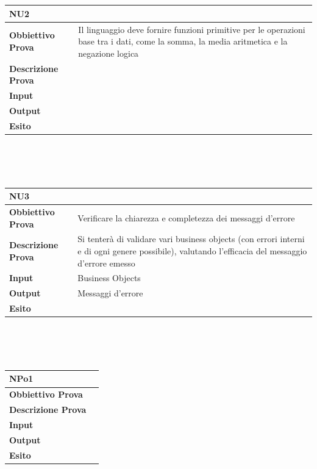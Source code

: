 \documentclass[11pt,titlepage,a4paper]{report}
\begin{document}
\\
\\
\begin{tabular}{||p{4.5cm}||p{7.5cm}||}
\hline
\textbf{\textsf{NU2}}& \\
\hline
{\textbf {Obbiettivo Prova}}& Il linguaggio deve fornire funzioni primitive per le operazioni base tra i dati, come la somma, la media aritmetica e la negazione logica \\ \hline
{\textbf{Descrizione Prova}}&  \\ \hline
{\textbf{Input}}&  \\ \hline
{\textbf{Output}}& \\ \hline
{\textbf{Esito}}&  \\ \hline
\end{tabular} \\
\\
\\
\begin{tabular}{||p{4.5cm}||p{7.5cm}||}
\hline
\textbf{\textsf{NU3}}& \\
\hline
{\textbf{Obbiettivo Prova}}& Verificare la chiarezza e completezza dei messaggi d'errore\\ \hline
{\textbf{Descrizione Prova}}& Si tenter\`a di validare vari business objects (con errori interni e di ogni genere possibile), valutando l'efficacia del messaggio d'errore emesso \\ \hline
{\textbf{Input}}&  Business Objects \\ \hline
{\textbf{Output}}& Messaggi d'errore\\ \hline
{\textbf{Esito}}&  \\ \hline
\end{tabular} \\
\\
\\
\begin{tabular}{||p{4.5cm}||p{7.5cm}||}
\hline
\textbf{\textsf{NPo1}}& \\
\hline
{\textbf{Obbiettivo Prova}}& \\ \hline
{\textbf{Descrizione Prova}}&  \\ \hline
{\textbf{Input}}&  \\ \hline
{\textbf{Output}}& \\ \hline
{\textbf{Esito}}&  \\ \hline
\end{tabular} \\
\\
\\
\end{document}
